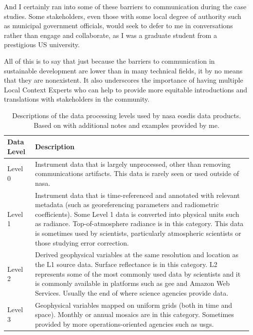 And I certainly ran into some of these barriers to communication during the case studies. Some stakeholders, even those with some local degree of authority such as municipal government officials, would seek to defer to me in conversations rather than engage and collaborate, as I was a graduate student from a prestigious US university. 

All of this is to say that just because the barriers to communication in sustainable development are lower than in many technical fields, it by no means that they are nonexistent. It also underscores the importance of having multiple Local Context Experts who can help to provide more equitable introductions and translations with stakeholders in the community.

\begin{table}[!htb]
\caption[NASA EOSDIS Data Processing Levels]{Descriptions of the data processing levels used by \ac{nasa} \ac{eosdis} data products. Based on \cite{earthsciencedatasystemsDataProcessingLevels2016} with additional notes and examples provided by me.}
\label{tab:data-processing-levels}
\begin{center}
\scriptsize
\begin{tabular}{ C{3cm}   L{8cm} } \hline
 
\textbf{Data Level} & \textbf{Description} \\ \hline

Level 0 & Instrument data that is largely unprocessed, other than removing communications artifacts. This data is rarely seen or used outside of \ac{nasa}. \\

Level 1 & Instrument data that is time-referenced and annotated with relevant metadata (such as georeferencing parameters and radiometric coefficients). Some Level 1 data is converted into physical units such as radiance. Top-of-atmosphere radiance is in this category. This data is sometimes used by scientists, particularly atmospheric scientists or those studying error correction. \\ 

Level 2 & Derived geophysical variables at the same resolution and location as the L1 source data. Surface reflectance is in this category. L2 represents some of the most commonly used data by scientists and it is commonly available in platforms such as \ac{gee} and Amazon Web Services. Usually the end of where science agencies provide data. \\

Level 3 & Geophysical variables mapped on uniform grids (both in time and space). Monthly or annual mosaics are in this category. Sometimes provided by more operations-oriented agencies such as \ac{usgs}. \\


\end{tabular}
\end{center}
\end{table}
